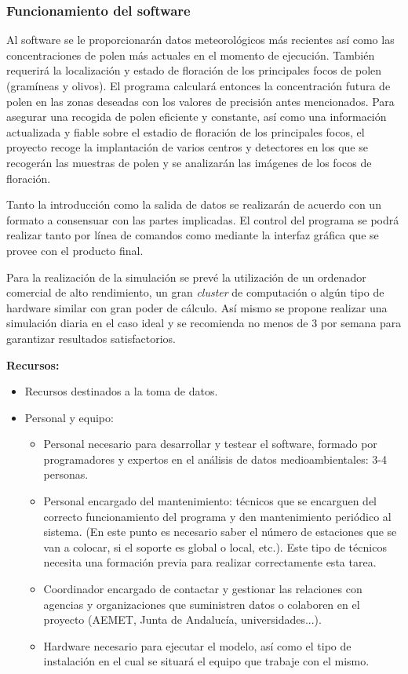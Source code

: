\documentclass[12pt,oneside,a4paper]{article}
\numberwithin{figure}{section}
\begin{document}
\subsubsection{Funcionamiento del software}

Al software se le proporcionarán datos meteorológicos más recientes así como las concentraciones de polen más actuales en el momento de ejecución. También requerirá la localización y estado de floración de los principales focos de polen (gramíneas y olivos). El programa calculará entonces la concentración futura de polen en las zonas deseadas con los valores de precisión antes mencionados. Para asegurar una recogida de polen eficiente y constante, así como una información actualizada y fiable sobre el estadio de floración de los principales focos, el proyecto recoge la implantación de varios centros y detectores en los que se recogerán las muestras de polen y se analizarán las imágenes de los focos de floración.

Tanto la introducción como la salida de datos se realizarán de acuerdo con un formato a consensuar con las partes implicadas. El control del programa se podrá realizar tanto por línea de comandos como mediante la interfaz gráfica que se provee con el producto final.

Para la realización de la simulación se prevé la utilización de un ordenador comercial de alto rendimiento, un gran \textit{cluster} de computación o algún tipo de hardware similar con gran poder de cálculo. Así mismo se propone realizar una simulación diaria en el caso ideal y se recomienda no menos de 3 por semana para garantizar resultados satisfactorios.

\clearpage

\textbf{Recursos:}

\begin{itemize}
\item Recursos destinados a la toma de datos.
\item Personal y equipo:
\begin{itemize}
\item Personal necesario para desarrollar y testear el software, formado por programadores y expertos en el análisis de datos medioambientales: 3-4 personas.
\item Personal encargado del mantenimiento: técnicos que se encarguen del correcto funcionamiento del programa y den mantenimiento periódico al sistema. (En este punto es necesario saber el número de estaciones que se van a colocar, si el soporte es global o local, etc.). Este tipo de técnicos necesita una formación previa para realizar correctamente esta tarea.
\item Coordinador encargado de contactar y gestionar las relaciones con agencias y organizaciones que suministren datos o colaboren en el proyecto (AEMET, Junta de Andalucía, universidades...).
\item Hardware necesario para ejecutar el modelo, así como el tipo de instalación en el cual se situará el equipo que trabaje con el mismo.
\end{itemize}
\end{itemize}
\end{document}
